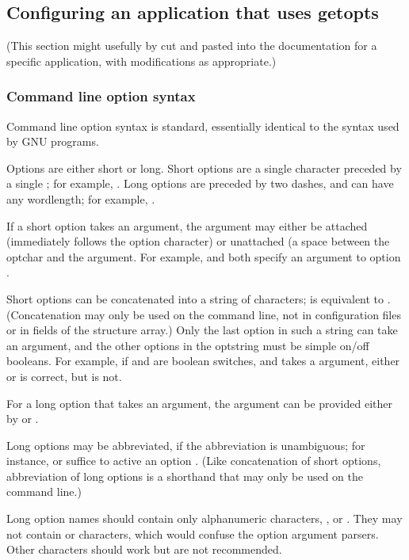 \subsection{Configuring an application that uses getopts}

(This section might usefully by cut and pasted into the documentation
for a specific application, with modifications as appropriate.)

   \subsubsection{Command line option syntax}

Command line option syntax is standard, essentially identical to the
syntax used by GNU programs.

Options are either short or long. Short options are a single character
preceded by a single \ccode{-}; for example, . Long options
are preceded by two dashes, and can have any wordlength; for example,
.

If a short option takes an argument, the argument may either be
attached (immediately follows the option character) or unattached (a
space between the optchar and the argument. For example, 
and  both specify an argument  to option
.

Short options can be concatenated into a string of characters;
 is equivalent to . (Concatenation may
only be used on the command line, not in configuration files or in
fields of the  structure array.) Only the last
option in such a string can take an argument, and the other options in
the optstring must be simple on/off booleans. For example, if
 and  are boolean switches, and  takes a
 argument, either  or 
is correct, but  is not.

For a long option that takes an argument, the argument can be provided
either by  or .

Long options may be abbreviated, if the abbreviation is unambiguous;
for instance,  or  suffice to active an
option . (Like concatenation of short options,
abbreviation of long options is a shorthand that may only be used on
the command line.)

Long option names should contain only alphanumeric characters,
\ccode{-}, or \ccode{\_}. They may not contain \ccode{=} or \ccode{,}
characters, which would confuse the option argument parsers. Other
characters should work but are not recommended.

